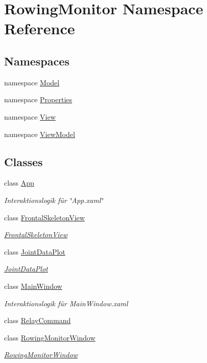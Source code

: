 \hypertarget{namespace_rowing_monitor}{}\section{Rowing\+Monitor Namespace Reference}
\label{namespace_rowing_monitor}
\subsection*{Namespaces}
\begin{DoxyCompactItemize}
\item 
namespace \hyperlink{namespace_rowing_monitor_1_1_model}{Model}
\item 
namespace \hyperlink{namespace_rowing_monitor_1_1_properties}{Properties}
\item 
namespace \hyperlink{namespace_rowing_monitor_1_1_view}{View}
\item 
namespace \hyperlink{namespace_rowing_monitor_1_1_view_model}{View\+Model}
\end{DoxyCompactItemize}
\subsection*{Classes}
\begin{DoxyCompactItemize}
\item 
class \hyperlink{class_rowing_monitor_1_1_app}{App}
\begin{DoxyCompactList}\small\item\em Interaktionslogik für \char`\"{}\+App.\+xaml\char`\"{} \end{DoxyCompactList}\item 
class \hyperlink{class_rowing_monitor_1_1_frontal_skeleton_view}{Frontal\+Skeleton\+View}
\begin{DoxyCompactList}\small\item\em \hyperlink{class_rowing_monitor_1_1_frontal_skeleton_view}{Frontal\+Skeleton\+View} \end{DoxyCompactList}\item 
class \hyperlink{class_rowing_monitor_1_1_joint_data_plot}{Joint\+Data\+Plot}
\begin{DoxyCompactList}\small\item\em \hyperlink{class_rowing_monitor_1_1_joint_data_plot}{Joint\+Data\+Plot} \end{DoxyCompactList}\item 
class \hyperlink{class_rowing_monitor_1_1_main_window}{Main\+Window}
\begin{DoxyCompactList}\small\item\em Interaktionslogik für Main\+Window.\+xaml \end{DoxyCompactList}\item 
class \hyperlink{class_rowing_monitor_1_1_relay_command}{Relay\+Command}
\item 
class \hyperlink{class_rowing_monitor_1_1_rowing_monitor_window}{Rowing\+Monitor\+Window}
\begin{DoxyCompactList}\small\item\em \hyperlink{class_rowing_monitor_1_1_rowing_monitor_window}{Rowing\+Monitor\+Window} \end{DoxyCompactList}\end{DoxyCompactItemize}
